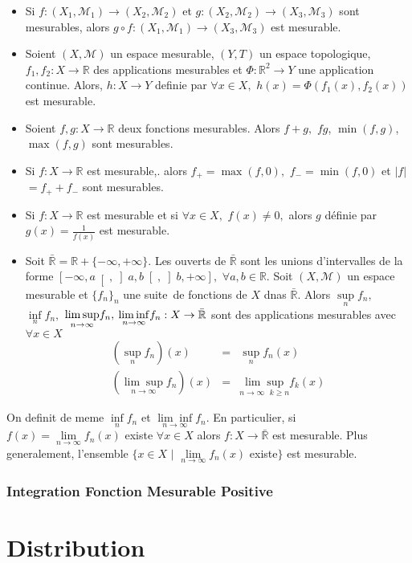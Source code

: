 \documentclass[3pt]{article}
\begin{document}
\begin{itemize}
\item Si $f:(X_{1},\mathcal{M}_{1})\rightarrow (X_{2},\mathcal{M}_{2})$ et $%
g:(X_{2},\mathcal{M}_{2})\rightarrow (X_{3},\mathcal{M}_{3})$ sont
mesurables, alors $g\circ f:(X_{1},\mathcal{M}_{1})\rightarrow (X_{3},%
\mathcal{M}_{3})$ est mesurable.

\item Soient $(X,\mathcal{M})$ un espace mesurable, $(Y,T)$ un espace
topologique, $f_{1},f_{2}:X\rightarrow \mathbb{R}$ des applications
mesurables et $\Phi :\mathbb{R}^{2}\rightarrow Y$ une application continue.
Alors, $h:X\rightarrow Y$ definie par $\forall x\in X,$ $h(x)=\Phi
(f_{1}(x),f_{2}(x))$ est mesurable.

\item Soient $f,g:X\rightarrow \mathbb{R}$ deux fonctions mesurables. Alors $%
f+g,$ $fg$, $\min (f,g)$, $\max (f,g)$ sont mesurables.

\item Si $f:X\rightarrow \mathbb{R}$ est mesurable,. alors $f_{+}=\max (f,0),
$ $f_{-}=\min (f,0)$ et $|f|$ $=f_{+}+f_{-}$ sont mesurables.

\item Si $f:X\rightarrow \mathbb{R}$ est mesurable et si $\forall x\in X,$ $%
f(x)\neq 0,$ alors $g$ d\'{e}finie par $g(x)=\frac{1}{f(x)}$ est mesurable.

\item Soit $\mathbb{\bar{R}}=\mathbb{R}+\{-\infty ,+\infty \}.$ Les ouverts
de $\mathbb{\bar{R}}$ sont les unions d'intervalles de la forme $\left[
-\infty ,a\right[ ,\left] a,b\right[ ,\left] b,+\infty \right] ,$ $\forall
a,b\in \mathbb{R}.$ Soit $(X,\mathcal{M})$ un espace mesurable et $%
\{f_{n}\}_{n}$ une suite\ de fonctions de $X$ dnas $\mathbb{\bar{R}}$. Alors 
$\underset{n}{\sup }f_{n},$ $\underset{n}{\inf }f_{n},$ $\underset{%
n\rightarrow \infty }{\lim \sup }f_{n},$ $\underset{n\rightarrow \infty }{%
\lim \inf }f_{n}:X\rightarrow \mathbb{\bar{R}}$ sont des applications
mesurables avec $\forall x\in X$%
\begin{eqnarray*}
\left( \underset{n}{\sup }f_{n}\right) (x) &=&\underset{n}{\sup }f_{n}(x) \\
\left( \underset{n\rightarrow \infty }{\lim \sup }f_{n}\right) (x) &=&%
\underset{n\rightarrow \infty \text{ }k\geq n}{\lim \sup }f_{k}(x)
\end{eqnarray*}
\end{itemize}

On definit de meme $\underset{n}{\inf }f_{n}$ et $\underset{n\rightarrow
\infty }{\lim \inf }f_{n}.$ En particulier, si $f(x)=\underset{n\rightarrow
\infty }{\lim }f_{n}(x)$ existe $\forall x\in X$ alors $f:X\rightarrow 
\mathbb{\bar{R}}$ est mesurable. Plus generalement, l'ensemble $\{x\in X$ $|$
$\underset{n\rightarrow \infty }{\lim }f_{n}(x)$ existe$\}$ est mesurable.

\subsubsection{Integration Fonction Mesurable Positive}

\bigskip 

\bigskip 

\section{Distribution}

\bigskip
\end{document}
